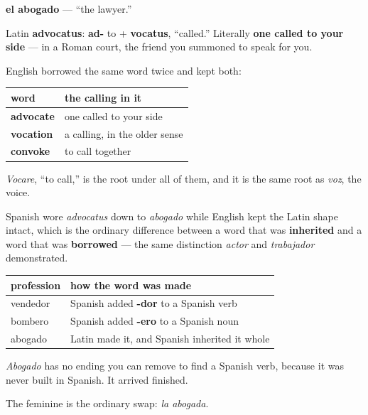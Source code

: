\begin{cousinweb}
\textbf{el abogado} — \textquotedblleft{}the lawyer.\textquotedblright{}

Latin \textbf{advocatus}: \textbf{ad-} to + \textbf{vocatus}, \textquotedblleft{}called.\textquotedblright{} Literally \textbf{one called to your side} — in a Roman court, the friend you summoned to speak for you.

English borrowed the same word twice and kept both:

\noindent
\begin{tabularx}{\linewidth}{@{}>{\raggedright\arraybackslash}X>{\raggedright\arraybackslash}X@{}}
\toprule
\textbf{word} & \textbf{the calling in it} \\
\midrule
\textbf{advocate} & one called to your side \\
\textbf{vocation} & a calling, in the older sense \\
\textbf{convoke} & to call together \\
\bottomrule
\end{tabularx}

\emph{Vocare}, \textquotedblleft{}to call,\textquotedblright{} is the root under all of them, and it is the same root as \emph{voz}, the voice.

Spanish wore \emph{advocatus} down to \emph{abogado} while English kept the Latin shape intact, which is the ordinary difference between a word that was \textbf{inherited} and a word that was \textbf{borrowed} — the same distinction \emph{actor} and \emph{trabajador} demonstrated.
\end{cousinweb}

\begin{grammarlens}[title={Grammar Lens: the profession without a visible ending}]
\noindent
\begin{tabularx}{\linewidth}{@{}>{\raggedright\arraybackslash}X>{\raggedright\arraybackslash}X@{}}
\toprule
\textbf{profession} & \textbf{how the word was made} \\
\midrule
vendedor & Spanish added \textbf{-dor} to a Spanish verb \\
bombero & Spanish added \textbf{-ero} to a Spanish noun \\
abogado & Latin made it, and Spanish inherited it whole \\
\bottomrule
\end{tabularx}

\emph{Abogado} has no ending you can remove to find a Spanish verb, because it was never built in Spanish. It arrived finished.

The feminine is the ordinary swap: \emph{la abogada}.
\end{grammarlens}

